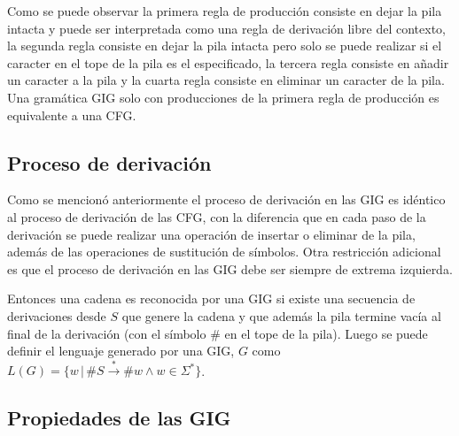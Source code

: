 \documentclass[12pt]{article}
\begin{document}
Como se puede observar la primera regla de producción consiste en dejar la pila intacta y puede ser interpretada como una regla de derivación
libre del contexto, la segunda regla consiste en dejar la pila intacta pero solo se puede realizar si el caracter en el tope de la pila es el
especificado, la tercera regla consiste en añadir un caracter a la pila y la cuarta regla consiste en eliminar un caracter de la pila.
Una gramática GIG solo con producciones de la primera regla de producción es equivalente a una CFG.

\subsection{Proceso de derivación}

Como se mencionó anteriormente el proceso de derivación en las GIG es idéntico al proceso de derivación de las CFG, con la diferencia que
en cada paso de la derivación se puede realizar una operación de insertar o eliminar de la pila, además de las operaciones de sustitución de símbolos.
Otra restricción adicional es que el proceso de derivación en las GIG debe ser siempre de extrema izquierda.

Entonces una cadena es reconocida por una GIG si existe una secuencia de derivaciones desde $S$ que genere la cadena y que además la pila
termine vacía al final de la derivación (con el símbolo $\#$ en el tope de la pila). Luego se puede definir el lenguaje generado por una GIG, $G$
como $L(G)=\{w\,|\,\#S\overset{*}{\to}\#w \wedge w\in \Sigma^* \}$.

\subsection{Propiedades de las GIG}
\end{document}
